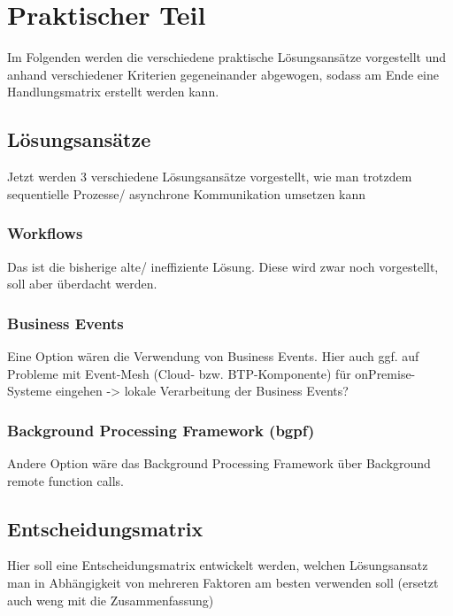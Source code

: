 \chapter{Praktischer Teil}

Im Folgenden werden die verschiedene praktische Lösungsansätze vorgestellt und anhand verschiedener Kriterien gegeneinander abgewogen, sodass am Ende eine Handlungsmatrix erstellt werden kann.

\section{Lösungsansätze}

Jetzt werden 3 verschiedene Lösungsansätze vorgestellt, wie man trotzdem sequentielle Prozesse/ asynchrone Kommunikation umsetzen kann

\subsection{Workflows}

Das ist die bisherige alte/ ineffiziente Lösung. Diese wird zwar noch vorgestellt, soll aber überdacht werden.

\subsection{Business Events}

Eine Option wären die Verwendung von Business Events. Hier auch ggf. auf Probleme mit Event-Mesh (Cloud- bzw. BTP-Komponente) für onPremise-Systeme eingehen -> lokale Verarbeitung der Business Events? 

\subsection{Background Processing Framework (bgpf)}

Andere Option wäre das Background Processing Framework über Background remote function calls.

\section{Entscheidungsmatrix}

Hier soll eine Entscheidungsmatrix entwickelt werden, welchen Lösungsansatz man in Abhängigkeit von mehreren Faktoren am besten verwenden soll (ersetzt auch weng mit die Zusammenfassung)